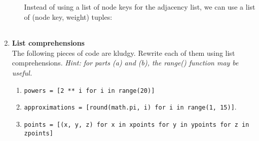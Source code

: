 \documentclass{article}
\newcounter{points}
\begin{document}
\begin{enumerate}
\begin{enumerate}
Instead of using a list of node keys for the adjacency list, we can use a list of (node key, weight) tuples: \\
\begin{tabular}{c}

\end{tabular}

\end{enumerate}




\item \textbf{List comprehensions} \\
The following pieces of code are kludgy.  Rewrite each of them using list comprehensions.  \emph{Hint: for parts (a) and (b), the range() function may be useful.}

\begin{enumerate}
\item 
\texttt{powers = [2 ** i for i in range(20)]}
\end{enumerate}

\begin{enumerate}
\setcounter{enumii}{1}
\item 
\texttt{approximations = [round(math.pi, i) for i in range(1, 15)]}.  \\

\end{enumerate}

\begin{enumerate}
\setcounter{enumii}{2}
\item 
\texttt{points = [(x, y, z) for x in xpoints for y in ypoints for z in zpoints]}
\end{enumerate}


\end{enumerate}
\end{document}
